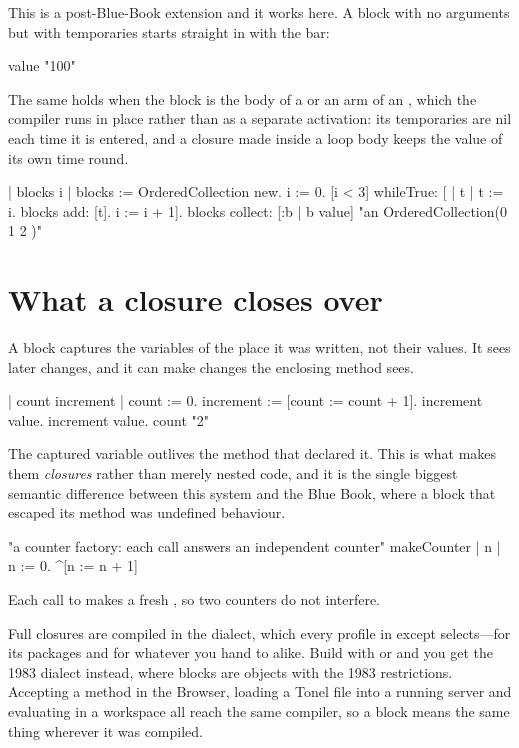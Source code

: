 This is a post-Blue-Book extension and it works here. A block with no
arguments but with temporaries starts straight in with the bar:

\begin{st}
[ | t | t := 10. t squared ] value       "100"
\end{st}

The same holds when the block is the body of a  or an arm of
an , which the compiler runs in place rather than as a separate
activation: its temporaries are nil each time it is entered, and a closure
made inside a loop body keeps the value of its own time round.

\begin{st}
| blocks i |
blocks := OrderedCollection new.
i := 0.
[i < 3] whileTrue: [ | t | t := i. blocks add: [t]. i := i + 1].
blocks collect: [:b | b value]           "an OrderedCollection(0 1 2 )"
\end{st}

\section{What a closure closes over}

A block captures the variables of the place it was written, not their values.
It sees later changes, and it can make changes the enclosing method sees.

\begin{st}
| count increment |
count := 0.
increment := [count := count + 1].
increment value.
increment value.
count                                     "2"
\end{st}

The captured variable outlives the method that declared it. This is what makes
them \emph{closures} rather than merely nested code, and it is the single
biggest semantic difference between this system and the Blue Book, where a
block that escaped its method was undefined behaviour.

\begin{st}
"a counter factory: each call answers an independent counter"
makeCounter
    | n |
    n := 0.
    ^[n := n + 1]
\end{st}

Each call to  makes a fresh , so two counters do not
interfere.

\begin{stnote}
Full closures are compiled in the  dialect, which every profile
in  except  selects---for its packages and for
whatever you hand to  alike. Build with
 or  and you
get the 1983 dialect instead, where blocks are  objects
with the 1983 restrictions. Accepting a method in the Browser, loading a
Tonel file into a running server and evaluating in a workspace all reach the
same compiler, so a block means the same thing wherever it was compiled.
\end{stnote}

